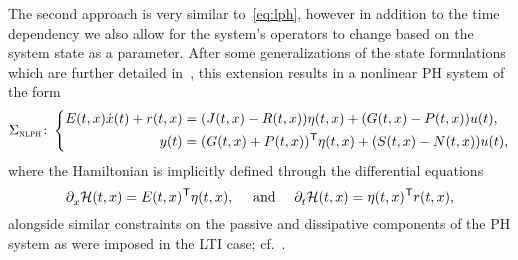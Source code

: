 \begin{remark}
    The second approach is very similar to~\eqref{eq:lph}, however in addition to the time dependency we also allow for the system's operators to change based on the system state as a parameter.
    After some generalizations of the state formulations which are further detailed in~\cite{Mehrmann2023}, this extension results in a nonlinear \ac{PH} system of the form
    \begin{equation}\label{eq:nlph}
        \Sigma_{\msc{nlph}} \colon \left\lbrace
        \begin{aligned}
            E(t, x) \dot{x}(t) + r(t, x) &= (J(t, x) - R(t, x)) \eta(t, x) + (G(t, x) - P(t, x)) u(t), \\
            y(t) &= (G(t, x) + P(t, x))\trans \eta(t, x) + (S(t, x) - N(t, x)) u(t),
        \end{aligned}
        \right.
    \end{equation}
    where the Hamiltonian is implicitly defined through the differential equations
    \begin{equation*}
        \pd{} \mcl{H}(t, x) = E(t, x)\trans \eta(t, x),\quad \text{ and }\quad \pd[t]{} \mcl{H}(t, x) = \eta(t, x)\trans r(t, x),
    \end{equation*}
    alongside similar constraints on the passive and dissipative components of the \ac{PH} system as were imposed in the \ac{LTI} case; cf.~\cite[Definition~4.1]{Mehrmann2023}.
\end{remark}

